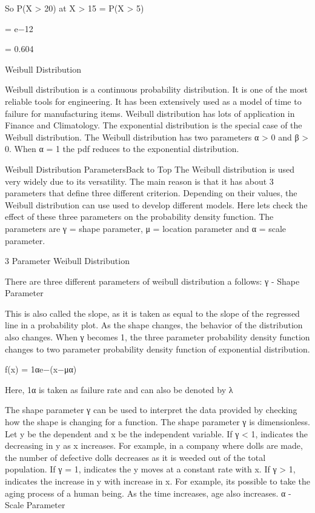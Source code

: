 \documentclass{beamer}
\begin{document}
	So P(X > 20) at X > 15 = P(X > 5)
	
	= e−12
	
	= 0.604
	
	Weibull Distribution
	
	Weibull distribution is a continuous probability distribution. It is one of the most reliable tools for engineering. It has been extensively used as a model of time to failure for manufacturing items. Weibull distribution has lots of application in Finance and Climatology. The exponential distribution is the special case of the Weibull distribution. The Weibull distribution has two parameters α > 0 and β > 0. When α = 1 the pdf reduces to the exponential distribution.
	
	
	Weibull Distribution ParametersBack to Top
	The Weibull distribution is used very widely due to its versatility. The main reason is that it has about 3 parameters that define three different criterion. Depending on their values, the Weibull distribution can use used to develop different models. Here lets check the effect of these three parameters on the probability density function. The parameters are γ = shape parameter, μ = location parameter and α = scale parameter. 
	
	3 Parameter Weibull Distribution
	
	There are three different parameters of weibull distribution a follows:
	γ - Shape Parameter
	
	This is also called the slope, as it is taken as equal to the slope of the regressed line in a probability plot. As the shape changes, the behavior of the distribution also changes. When γ becomes 1, the three parameter probability density function changes to two parameter probability density function of exponential distribution.
	
	f(x) = 1αe−(x−μα)
	
	Here, 1α is taken as failure rate and can also be denoted by λ
	
	The shape parameter γ can be used to interpret the data provided by checking how the shape is changing for a function. The shape parameter γ is dimensionless. Let y be the dependent and x be the independent variable.
	If γ < 1, indicates the decreasing in y as x increases. For example, in a company where dolls are made, the number of defective dolls decreases as it is weeded out of the total population.
	If γ = 1, indicates the y moves at a constant rate with x.
	If γ > 1, indicates the increase in y with increase in x. For example, its possible to take the aging process of a human being. As the time increases, age also increases.
	α - Scale Parameter
	
\end{document}

